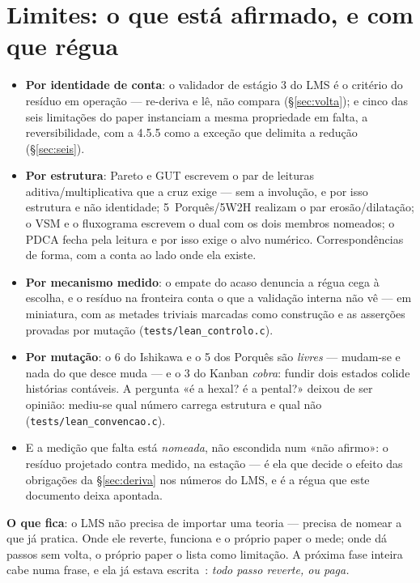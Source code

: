 \documentclass[11pt,a4paper]{article}
\newcommand{\code}[1]{\texttt{\small #1}}
\begin{document}
\section{Limites: o que está afirmado, e com que régua}\label{sec:limites}

\begin{itemize}\itemsep3pt
\item \textbf{Por identidade de conta}: o validador de estágio 3 do LMS é o critério do resíduo em
  operação --- re-deriva e lê, não compara (\S\ref{sec:volta}); e cinco das seis limitações do paper
  instanciam a mesma propriedade em falta, a reversibilidade, com a 4.5.5 como a exceção que delimita
  a redução (\S\ref{sec:seis}).
\item \textbf{Por estrutura}: Pareto e GUT escrevem o par de leituras aditiva/multiplicativa que a
  cruz exige --- sem a involução, e por isso estrutura e não identidade; 5~Porquês/5W2H realizam o par
  erosão/dilatação; o VSM e o fluxograma escrevem o dual com os dois membros nomeados; o PDCA fecha
  pela leitura e por isso exige o alvo numérico. Correspondências de forma, com a conta ao lado onde
  ela existe.
\item \textbf{Por mecanismo medido}: o empate do acaso denuncia a régua cega à escolha, e o resíduo na
  fronteira conta o que a validação interna não vê --- em miniatura, com as metades triviais marcadas
  como construção e as asserções provadas por mutação (\code{tests/lean\_controlo.c}).
\item \textbf{Por mutação}: o 6 do Ishikawa e o 5 dos Porquês são \emph{livres} --- mudam-se e nada do
  que desce muda --- e o 3 do Kanban \emph{cobra}: fundir dois estados colide histórias contáveis. A
  pergunta «é a hexal? é a pental?» deixou de ser opinião: mediu-se qual número carrega estrutura e
  qual não (\code{tests/lean\_convencao.c}).
\item E a medição que falta está \emph{nomeada}, não escondida num «não afirmo»: o resíduo projetado
  contra medido, na estação --- é ela que decide o efeito das obrigações da \S\ref{sec:deriva} nos
  números do LMS, e é a régua que este documento deixa apontada.
\end{itemize}

\smallskip
\noindent \textbf{O que fica}: o LMS não precisa de importar uma teoria --- precisa de nomear a que já
pratica. Onde ele reverte, funciona e o próprio paper o mede; onde dá passos sem volta, o próprio
paper o lista como limitação. A próxima fase inteira cabe numa frase, e ela já estava
escrita~\cite{arquitetura}: \emph{todo passo reverte, ou paga.}
\end{document}
